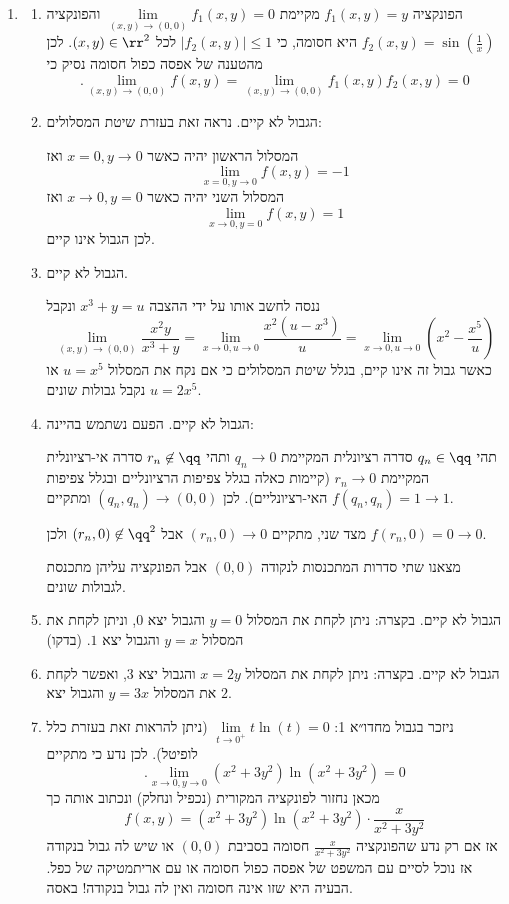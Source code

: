 \documentclass[12pt, a4paper]{article}
\begin{document}
\begin{enumerate}

\item
\begin{enumerate}
    \item 
    הפונקציה
    $f_1(x,y)=y$
    מקיימת
$\underset{(x,y)\to(0,0)}{\lim}f_1(x,y)=0$
והפונקציה
$f_2(x,y)=\sin\left(\frac{1}{x}\right)$
היא חסומה, כי
$|f_2(x,y)|\le 1$
לכל
$(x,y)\in\rr^2$.
לכן מהטענה של אפסה כפול חסומה נסיק כי
$$.\underset{(x,y)\to(0,0)}{\lim}f(x,y)
=\underset{(x,y)\to(0,0)}{\lim}f_1(x,y)f_2(x,y)=0
$$
\item 
הגבול לא קיים. נראה זאת בעזרת שיטת המסלולים:

המסלול הראשון יהיה כאשר
$x=0, y\to 0$
ואז
$$\underset{x=0, y\to0}{\lim}f(x,y)=-1$$
המסלול השני יהיה כאשר
$x\to0, y=0$
ואז
$$\underset{x\to0, y=0}{\lim}f(x,y)=1$$
לכן הגבול אינו קיים.\\
\item 
הגבול לא קיים.

ננסה לחשב אותו על ידי ההצבה
$x^3+y=u$
ונקבל
$$\underset{(x,y)\to(0,0)}{\lim}\frac{x^2y}{x^3+y}=
\underset{x\to 0, u\to 0}{\lim}
\frac{x^2(u-x^3)}{u}=
\underset{x\to 0, u\to 0}{\lim}
\left(x^2-\frac{x^5}{u}\right)
$$
כאשר גבול זה אינו קיים, בגלל שיטת המסלולים כי אם נקח את המסלול
$u=x^5$
או
$u=2x^5$
נקבל גבולות שונים.\\
\item 
הגבול לא קיים. הפעם נשתמש בהיינה:

תהי
$q_n\in\qq$
סדרה רציונלית המקיימת
$q_n\to0$
ותהי
$r_n\not\in\qq$
סדרה אי-רציונלית המקיימת
$r_n\to0$
(קיימות כאלה בגלל צפיפות הרציונליים ובגלל צפיפות האי-רציונליים). לכן
$(q_n,q_n)\to (0,0)$
ומתקיים
$f(q_n,q_n)=1\to 1$.

מצד שני, מתקיים
$(r_n,0)\to 0$
אבל
$(r_n,0)\not\in\qq^2$
ולכן
$f(r_n,0)=0\to0$.

מצאנו שתי סדרות המתכנסות לנקודה
$(0,0)$
אבל הפונקציה עליהן מתכנסת לגבולות שונים.\\
\item 
הגבול לא קיים. בקצרה: ניתן לקחת את המסלול
$y=0$
והגבול יצא
$0$,
וניתן לקחת את המסלול
$y=x$
והגבול יצא
$1$.
(בדקו)\\
\item 
הגבול לא קיים.
בקצרה:
ניתן לקחת את המסלול
$x=2y$
והגבול יצא
$3$,
ואפשר לקחת את המסלול
$y=3x$
והגבול יצא
$2$.\\
\item 
ניזכר בגבול מחדו״א 1:
$\underset{t\to0^+}{\lim}t\ln(t)=0$
(ניתן להראות זאת בעזרת כלל לופיטל). לכן נדע כי מתקיים
$$.\underset{x\to0,y\to0}{\lim}(x^2+3y^2)\ln(x^2+3y^2)=0$$
מכאן נחזור לפונקציה המקורית (נכפיל ונחלק) ונכתוב אותה כך
$$f(x, y) = (x^2+3y^2)\ln(x^2 + 3y^2)\cdot\frac{x}{x^2+3y^2}$$
אז אם רק נדע שהפונקציה
$\frac{x}{x^2+3y^2}$
חסומה בסביבת
$(0,0)$
או שיש לה גבול בנקודה אז נוכל לסיים עם המשפט של אפסה כפול חסומה או עם אריתמטיקה של כפל. הבעיה היא שזו אינה חסומה ואין לה גבול בנקודה! באסה.


\end{enumerate}
\end{enumerate}
\end{document}
